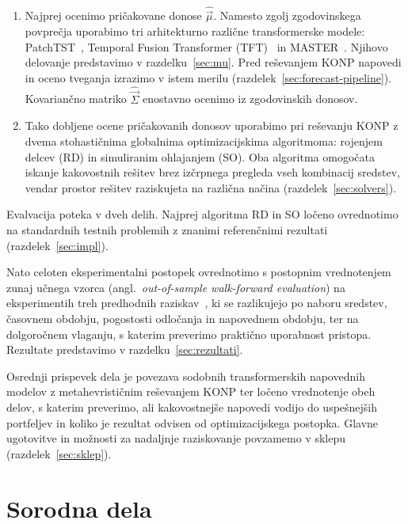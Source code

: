 \documentclass[9pt]{style/friteza}
\begin{document}
\begin{enumerate}
    \item Najprej ocenimo pričakovane donose $\hat{\vec{\mu}}$. Namesto zgolj zgodovinskega povprečja uporabimo tri arhitekturno različne transformerske modele: PatchTST~\cite{nie2023patchtst}, Temporal Fusion Transformer (TFT)~\cite{lim2021tft} in MASTER~\cite{li2024master}. Njihovo delovanje predstavimo v razdelku~\ref{sec:mu}. Pred reševanjem KONP napovedi in oceno tveganja izrazimo v istem merilu (razdelek~\ref{sec:forecast-pipeline}). Kovariančno matriko $\hat{\vec{\Sigma}}$ enostavno ocenimo iz zgodovinskih donosov. 

    \item Tako dobljene ocene pričakovanih donosov uporabimo pri reševanju KONP z dvema stohastičnima globalnima optimizacijskima algoritmoma: rojenjem delcev (RD) in simuliranim ohlajanjem (SO). Oba algoritma omogočata iskanje kakovostnih rešitev brez izčrpnega pregleda vseh kombinacij sredstev, vendar prostor rešitev raziskujeta na različna načina (razdelek~\ref{sec:solvers}).
\end{enumerate}

Evalvacija poteka v dveh delih. Najprej algoritma RD in SO ločeno ovrednotimo na standardnih testnih problemih z znanimi referenčnimi rezultati (razdelek~\ref{sec:impl}).

Nato celoten eksperimentalni postopek ovrednotimo s postopnim vrednotenjem zunaj učnega vzorca (angl.\ \emph{out-of-sample walk-forward evaluation}) na eksperimentih treh predhodnih raziskav~\cite{leow2021,wang2023oneshot,aprea2026}, ki se razlikujejo po naboru sredstev, časovnem obdobju, pogostosti odločanja in napovednem obdobju, ter na dolgoročnem vlaganju, s katerim preverimo praktično uporabnost pristopa. Rezultate predstavimo v razdelku~\ref{sec:rezultati}.

Osrednji prispevek dela je povezava sodobnih transformerskih napovednih modelov z metahevrističnim reševanjem KONP ter ločeno vrednotenje obeh delov, s katerim preverimo, ali kakovostnejše napovedi vodijo do uspešnejših portfeljev in koliko je rezultat odvisen od optimizacijskega postopka. Glavne ugotovitve in možnosti za nadaljnje raziskovanje povzamemo v sklepu (razdelek~\ref{sec:sklep}). 

\section{Sorodna dela}\label{sec:sorodna}
\end{document}
